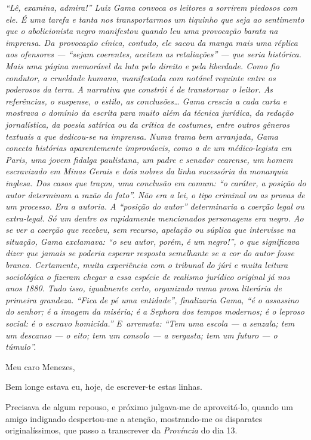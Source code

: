 \begin{resumo}
\emph{``Lê, examina, admira!'' Luiz Gama convoca os leitores a sorrirem
piedosos com ele. É uma tarefa e tanta nos transportarmos um tiquinho
que seja ao sentimento que o abolicionista negro manifestou quando leu
uma provocação barata na imprensa. Da~provocação cínica, contudo, ele
sacou da manga mais uma réplica aos ofensores --- ``sejam coerentes,
aceitem as retaliações'' --- que seria histórica. Mais uma página
memorável da luta pelo direito e pela liberdade. Como fio condutor, a
crueldade humana, manifestada com notável requinte entre os poderosos da
terra. A narrativa que constrói é de transtornar o leitor. As
referências, o suspense, o estilo, as conclusões\ldots{} Gama crescia a cada
carta e mostrava o domínio da escrita para muito além da técnica
jurídica, da redação jornalística, da poesia satírica ou da crítica de
costumes, entre outros gêneros textuais a que dedicou-se na imprensa.
Numa trama bem arranjada, Gama conecta histórias aparentemente
improváveis, como a de um médico-legista em Paris, uma jovem fidalga
paulistana, um padre e senador cearense, um homem escravizado em Minas
Gerais e dois nobres da linha sucessória da monarquia inglesa. Dos casos
que traçou, uma conclusão em comum: ``o caráter, a posição do autor
determinam a razão do fato''. Não era a lei, o tipo criminal ou as provas
de um processo. Era a autoria. A ``posição do autor'' determinaria a
coerção legal ou extra-legal. Só um dentre os rapidamente mencionados
personagens era negro. Ao se ver a coerção que recebeu, sem recurso,
apelação ou súplica que intervisse na situação, Gama exclamava: ``o seu
autor, porém, é um negro!'', o que significava dizer que jamais se
poderia esperar resposta semelhante se a cor do autor fosse branca.
Certamente, muita experiência com o tribunal do júri e muita leitura
sociológica o fizeram chegar a essa espécie de realismo jurídico
original já nos anos 1880. Tudo isso, igualmente certo, organizado numa
prosa literária de primeira grandeza. ``Fica de pé uma entidade'',
finalizaria Gama, ``é o assassino do senhor; é a imagem da miséria; é a
Sephora dos tempos modernos; é o leproso social: é o escravo homicida.''
E~arremata: ``Tem uma escola --- a senzala; tem um descanso --- o eito; tem
um consolo --- a vergasta; tem um futuro --- o túmulo''. }
\end{resumo}

Meu caro Menezes,

Bem longe estava eu, hoje, de escrever-te estas linhas.

Precisava de algum repouso, e próximo julgava-me de aproveitá-lo, quando
um amigo indignado despertou-me a atenção, mostrando-me os disparates
originalíssimos, que passo a transcrever da \emph{Província} do dia 13.

